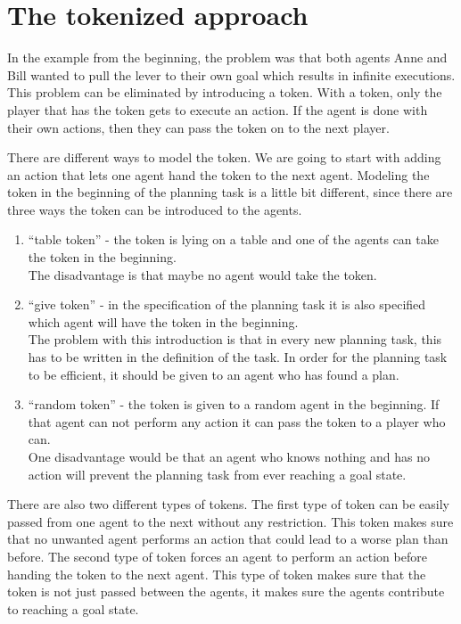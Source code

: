 \chapter{The tokenized approach}\label{chap:approach}

In the example from the beginning, the problem was that both agents Anne and Bill wanted to pull the lever to their own goal which results in infinite executions. This problem can be eliminated by introducing a token. With a token, only the player that has the token gets to execute an action. If the agent is done with their own actions, then they can pass the token on to the next player.

There are different ways to model the token. We are going to start with adding an action that lets one agent hand the token to the next agent. Modeling the token in the beginning of the planning task is a little bit different, since there are three ways the token can be introduced to the agents.
\begin{enumerate}
  \item ``table token'' - the token is lying on a table and one of the agents can take the token in the beginning. \\
  The disadvantage is that maybe no agent would take the token.
  \item ``give token'' - in the specification of the planning task it is also specified which agent will have the token in the beginning. \\
  The problem with this introduction is that in every new planning task, this has to be written in the definition of the task. In order for the planning task to be efficient, it should be given to an agent who has found a plan.
  \item ``random token'' - the token is given to a random agent in the beginning. If that agent can not perform any action it can pass the token to a player who can. \\
  One disadvantage would be that an agent who knows nothing and has no action will prevent the planning task from ever reaching a goal state.
\end{enumerate}

There are also two different types of tokens. The first type of token can be easily passed from one agent to the next without any restriction. This token makes sure that no unwanted agent performs an action that could lead to a worse plan than before. The second type of token forces an agent to perform an action before handing the token to the next agent. This type of token makes sure that the token is not just passed between the agents, it makes sure the agents contribute to reaching a goal state.

